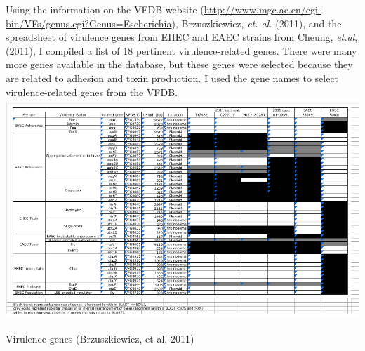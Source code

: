 \documentclass[12pt,]{article}
\newenvironment{Shaded}{\begin{snugshade}}{\end{snugshade}}
\newcommand{\KeywordTok}[1]{\textcolor[rgb]{0.13,0.29,0.53}{\textbf{#1}}}
\newcommand{\StringTok}[1]{\textcolor[rgb]{0.31,0.60,0.02}{#1}}
\newcommand{\CommentTok}[1]{\textcolor[rgb]{0.56,0.35,0.01}{\textit{#1}}}
\newcommand{\FunctionTok}[1]{\textcolor[rgb]{0.00,0.00,0.00}{#1}}
\newcommand{\OperatorTok}[1]{\textcolor[rgb]{0.81,0.36,0.00}{\textbf{#1}}}
\newcommand{\ExtensionTok}[1]{#1}
\newcommand{\NormalTok}[1]{#1}
\begin{document}
Using the information on the VFDB website
(\url{http://www.mgc.ac.cn/cgi-bin/VFs/genus.cgi?Genus=Escherichia}),
Brzuszkiewicz, \emph{et. al.} (2011), and the spreadsheet of virulence
genes from EHEC and EAEC strains from Cheung, \emph{et.al}, (2011), I
compiled a list of 18 pertinent virulence-related genes. There were many
more genes available in the database, but these genes were selected
because they are related to adhesion and toxin production. I used the
gene names to select virulence-related genes from the VFDB.\\
\includegraphics{spreadsheet.png}

\begin{center} Virulence genes (Brzuszkiewicz, et al, 2011) \end{center}

\begin{Shaded}
\end{Shaded}
\end{document}
